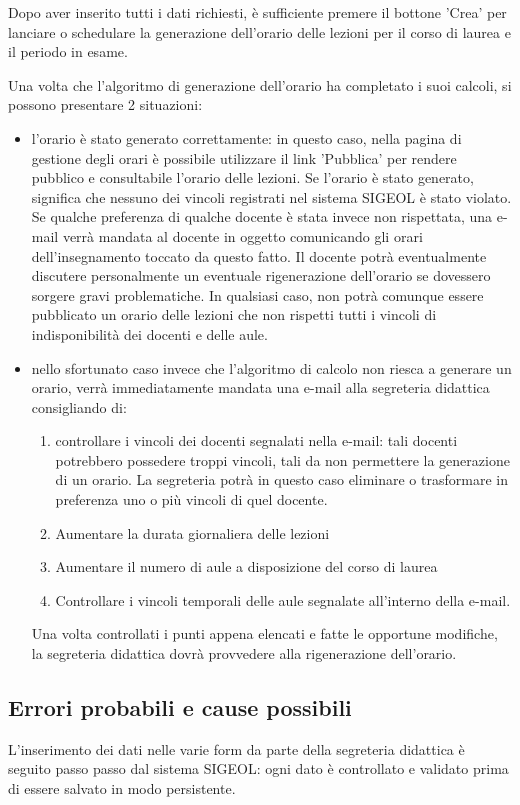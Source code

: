 \documentclass[11pt,a4paper]{article}
\begin{document}
Dopo aver inserito tutti i dati richiesti, è sufficiente premere il bottone 'Crea' per lanciare o schedulare la generazione dell'orario delle lezioni per il corso di laurea e il periodo in esame.

Una volta che l'algoritmo di generazione dell'orario ha completato i suoi calcoli, si possono presentare 2 situazioni:
\begin{itemize}
 \item l'orario è stato generato correttamente: in questo caso, nella pagina di gestione degli orari è possibile utilizzare il link 'Pubblica' per rendere pubblico e consultabile l'orario delle lezioni. Se l'orario è stato generato, significa che nessuno dei vincoli registrati nel sistema SIGEOL è stato violato. Se qualche preferenza di qualche docente è stata invece non rispettata, una e-mail verrà mandata al docente in oggetto comunicando gli orari dell'insegnamento toccato da questo fatto. Il docente potrà eventualmente discutere personalmente un eventuale rigenerazione dell'orario se dovessero sorgere gravi problematiche. In qualsiasi caso, non potrà comunque essere pubblicato un orario delle lezioni che non rispetti tutti i vincoli di indisponibilità dei docenti e delle aule.
 \item nello sfortunato caso invece che l'algoritmo di calcolo non riesca a generare un orario, verrà immediatamente mandata una e-mail alla segreteria didattica consigliando di:
	\begin{enumerate}
	 \item controllare i vincoli dei docenti segnalati nella e-mail: tali docenti potrebbero possedere troppi vincoli, tali da non permettere la generazione di un orario. La segreteria potrà in questo caso eliminare o trasformare in preferenza uno o più vincoli di quel docente.
	 \item Aumentare la durata giornaliera delle lezioni
	 \item Aumentare il numero di aule a disposizione del corso di laurea
	 \item Controllare i vincoli temporali delle aule segnalate all'interno della e-mail.
	\end{enumerate}
  Una volta controllati i punti appena elencati e fatte le opportune modifiche, la segreteria didattica dovrà provvedere alla rigenerazione dell'orario.
\end{itemize}
\subsection{Errori probabili e cause possibili}
L'inserimento dei dati nelle varie form da parte della segreteria didattica è seguito passo passo dal sistema SIGEOL: ogni dato è controllato e validato prima di essere salvato in modo persistente.
\end{document}
